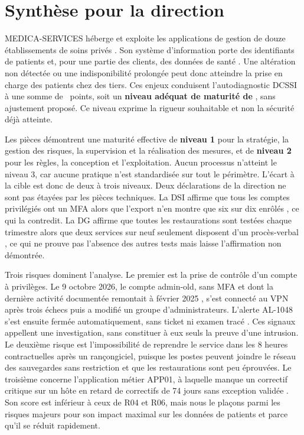 \section*{Synthèse pour la direction}

MEDICA-SERVICES héberge et exploite les applications de gestion de douze établissements de soins privés . Son système d'information porte des identifiants de patients et, pour une partie des clients, des données de santé . Une altération non détectée ou une indisponibilité prolongée peut donc atteindre la prise en charge des patients chez des tiers. Ces enjeux conduisent l'autodiagnostic DCSSI à une somme de \SommeMaxima\ points, soit un \textbf{niveau adéquat de maturité de \Cible}, sans ajustement proposé. Ce niveau exprime la rigueur souhaitable et non la sécurité déjà atteinte.

Les pièces démontrent une maturité effective de \textbf{niveau 1} pour la stratégie, la gestion des risques, la supervision et la réalisation des mesures, et de \textbf{niveau 2} pour les règles, la conception et l'exploitation. Aucun processus n'atteint le niveau 3, car aucune pratique n'est standardisée sur tout le périmètre. L'écart à la cible est donc de deux à trois niveaux. Deux déclarations de la direction ne sont pas étayées par les pièces techniques. La DSI affirme que tous les comptes privilégiés ont un MFA alors que l'export n'en montre que six sur dix enrôlés , ce qui la contredit. La DG affirme que toutes les restaurations sont testées chaque trimestre alors que deux services sur neuf seulement disposent d'un procès-verbal , ce qui ne prouve pas l'absence des autres tests mais laisse l'affirmation non démontrée.

Trois risques dominent l'analyse. Le premier est la prise de contrôle d'un compte à privilèges. Le 9 octobre 2026, le compte admin-old, sans MFA et dont la dernière activité documentée remontait à février 2025 , s'est connecté au VPN après trois échecs puis a modifié un groupe d'administrateurs. L'alerte AL-1048 s'est ensuite fermée automatiquement, sans ticket ni examen tracé . Ces signaux appellent une investigation, sans constituer à eux seuls la preuve d'une intrusion. Le deuxième risque est l'impossibilité de reprendre le service dans les 8 heures contractuelles après un rançongiciel, puisque les postes peuvent joindre le réseau des sauvegardes sans restriction  et que les restaurations sont peu éprouvées. Le troisième concerne l'application métier APP01, à laquelle manque un correctif critique  sur un hôte en retard de correctifs de 74 jours sans exception validée . Son score est inférieur à ceux de R04 et R06, mais nous le plaçons parmi les risques majeurs pour son impact maximal sur les données de patients et parce qu'il se réduit rapidement.

